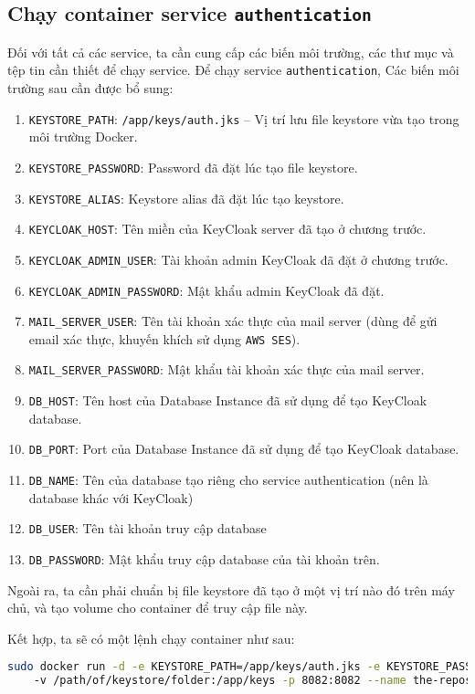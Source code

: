 \subsection{Chạy container service \texttt{authentication}}
Đối với tất cả các service, ta cần cung cấp các biến môi trường, các thư mục và tệp tin cần thiết để chạy service. Để chạy service \texttt{authentication}, Các biến môi trường sau cần được bổ sung:
\begin{enumerate}
    \item \texttt{KEYSTORE\_PATH}: \texttt{/app/keys/auth.jks} -- Vị trí lưu file keystore vừa tạo trong môi trường Docker.
    \item \texttt{KEYSTORE\_PASSWORD}: Password đã đặt lúc tạo file keystore.
    \item \texttt{KEYSTORE\_ALIAS}: Keystore alias đã đặt lúc tạo keystore.
    \item \texttt{KEYCLOAK\_HOST}: Tên miền của KeyCloak server đã tạo ở chương trước.
    \item \texttt{KEYCLOAK\_ADMIN\_USER}: Tài khoản admin KeyCloak đã đặt ở chương trước.
    \item \texttt{KEYCLOAK\_ADMIN\_PASSWORD}: Mật khẩu admin KeyCloak đã đặt.
    \item \texttt{MAIL\_SERVER\_USER}: Tên tài khoản xác thực của mail server (dùng để gửi email xác thực, khuyến khích sử dụng \texttt{AWS SES}).
    \item \texttt{MAIL\_SERVER\_PASSWORD}: Mật khẩu tài khoản xác thực của mail server.
    \item \texttt{DB\_HOST}: Tên host của Database Instance đã sử dụng để tạo KeyCloak database.
    \item \texttt{DB\_PORT}: Port của Database Instance đã sử dụng để tạo KeyCloak database.
    \item \texttt{DB\_NAME}: Tên của database tạo riêng cho service authentication (nên là database khác với KeyCloak)
    \item \texttt{DB\_USER}: Tên tài khoản truy cập database
    \item \texttt{DB\_PASSWORD}: Mật khẩu truy cập database của tài khoản trên.
\end{enumerate}

Ngoài ra, ta cần phải chuẩn bị file keystore đã tạo ở một vị trí nào đó trên máy chủ, và tạo volume cho container để truy cập file này.

Kết hợp, ta sẽ có một lệnh chạy container như sau:
\begin{lstlisting}[language=bash]
    sudo docker run -d -e KEYSTORE_PATH=/app/keys/auth.jks -e KEYSTORE_PASSWORD=example  -e ...
    -v /path/of/keystore/folder:/app/keys -p 8082:8082 --name the-repository-image-name:latest
\end{lstlisting}


